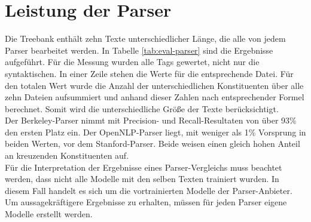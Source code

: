\section{Leistung der Parser}
Die Treebank enthält zehn Texte unterschiedlicher Länge, die alle von jedem Parser bearbeitet werden. In Tabelle \ref{tab:eval-parser} sind die Ergebnisse aufgeführt. Für die Messung wurden alle Tags gewertet, nicht nur die syntaktischen. In einer Zeile stehen die Werte für die entsprechende Datei. Für den totalen Wert wurde die Anzahl der unterschiedlichen Konstituenten über alle zehn Dateien aufsummiert und anhand dieser Zahlen nach entsprechender Formel berechnet. Somit wird die unterschiedliche Größe der Texte berücksichtigt. \\
Der Berkeley-Parser nimmt mit Precision- und Recall-Resultaten von über 93\% den ersten Platz ein. Der OpenNLP-Parser liegt, mit weniger als 1\% Vorsprung in beiden Werten, vor dem Stanford-Parser. Beide weisen einen gleich hohen Anteil an kreuzenden Konstituenten auf.\\
Für die Interpretation der Ergebnisse eines Parser-Vergleichs muss beachtet werden, dass nicht alle Modelle mit den selben Texten trainiert wurden. In diesem Fall handelt es sich um die vortrainierten Modelle der Parser-Anbieter. Um aussagekräftigere Ergebnisse zu erhalten, müssen für jeden Parser eigene Modelle erstellt werden. 
